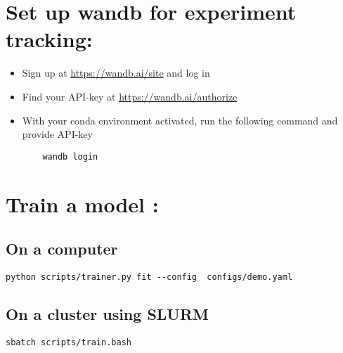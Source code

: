 \documentclass[11pt]{article}
\begin{document}
\section{Set up wandb for experiment tracking:}
\label{sec:orge1c8648}


\begin{itemize}
\item Sign up at \url{https://wandb.ai/site} and log in
\item Find your API-key at \url{https://wandb.ai/authorize}
\item With your conda environment activated, run the following command and provide API-key
\begin{verbatim}
    wandb login
\end{verbatim}
\end{itemize}

\section{Train a model :}
\label{sec:org34ab37a}
\subsection{On a computer}
\label{sec:orgfadb483}
\begin{verbatim}
python scripts/trainer.py fit --config  configs/demo.yaml
\end{verbatim}

\subsection{On a cluster using SLURM}
\label{sec:orgadabc7a}

\begin{verbatim}
sbatch scripts/train.bash
\end{verbatim}
\end{document}
